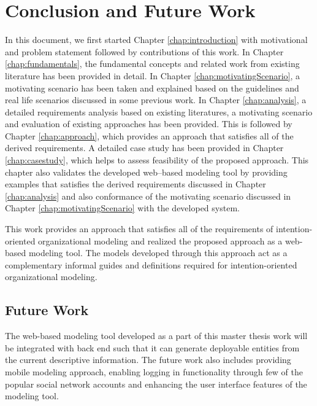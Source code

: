 \chapter{Conclusion and Future Work}
\label{chap:conclusion}

In this document, we first started Chapter \ref{chap:introduction} with motivational and problem statement followed by contributions of this work. In Chapter \ref{chap:fundamentals}, the fundamental concepts and related work from existing literature has been provided in detail. In Chapter \ref{chap:motivatingScenario}, a motivating scenario has been taken and explained based on the guidelines and real life scenarios discussed in some previous work. In Chapter \ref{chap:analysis}, a detailed requirements analysis based on existing literatures, a motivating scenario and evaluation of existing approaches has been provided. This is followed by Chapter \ref{chap:approach}, which provides an approach that satisfies all of the derived requirements. A detailed case study has been provided in Chapter \ref{chap:casestudy}, which helps to assess feasibility of the proposed approach. This chapter also validates the developed web–based modeling tool by providing examples that satisfies the derived requirements discussed in Chapter \ref{chap:analysis} and also conformance of the motivating scenario discussed in Chapter \ref{chap:motivatingScenario} with the developed system.

This work provides an approach that satisfies all of the requirements of intention-oriented organizational modeling and realized the proposed approach as a web-based modeling tool. The models developed through this approach act as a complementary informal guides and definitions required for intention-oriented organizational modeling. 

\section*{Future Work}
\label{sec:futurework}
The web-based modeling tool developed as a part of this master thesis work will be integrated with back end such that it can generate deployable entities from the current descriptive information. The future work also includes providing mobile modeling approach, enabling logging in functionality through few of the popular social network accounts and enhancing the user interface features of the modeling tool. 





